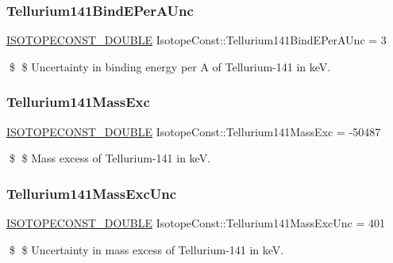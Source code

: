 \subsubsection{\texorpdfstring{Tellurium141\+Bind\+E\+Per\+A\+Unc}{Tellurium141BindEPerAUnc}}
{\footnotesize\ttfamily \mbox{\hyperlink{group___isotope_const-_macros_ga8f45a7272ce02c0b4c65c44636ed719a}{I\+S\+O\+T\+O\+P\+E\+C\+O\+N\+S\+T\+\_\+\+D\+O\+U\+B\+LE}} Isotope\+Const\+::\+Tellurium141\+Bind\+E\+Per\+A\+Unc = 3}

\$ \$ Uncertainty in binding energy per A of Tellurium-\/141 in keV. \mbox{\label{group___isotope_const-_tellurium-_te141_gac84bd58ed0e0b24aa4c090c67a823832}} 
\subsubsection{\texorpdfstring{Tellurium141\+Mass\+Exc}{Tellurium141MassExc}}
{\footnotesize\ttfamily \mbox{\hyperlink{group___isotope_const-_macros_ga8f45a7272ce02c0b4c65c44636ed719a}{I\+S\+O\+T\+O\+P\+E\+C\+O\+N\+S\+T\+\_\+\+D\+O\+U\+B\+LE}} Isotope\+Const\+::\+Tellurium141\+Mass\+Exc = -\/50487}

\$ \$ Mass excess of Tellurium-\/141 in keV. \mbox{\label{group___isotope_const-_tellurium-_te141_gad900681373042bf43e4c2dea7a878625}} 
\subsubsection{\texorpdfstring{Tellurium141\+Mass\+Exc\+Unc}{Tellurium141MassExcUnc}}
{\footnotesize\ttfamily \mbox{\hyperlink{group___isotope_const-_macros_ga8f45a7272ce02c0b4c65c44636ed719a}{I\+S\+O\+T\+O\+P\+E\+C\+O\+N\+S\+T\+\_\+\+D\+O\+U\+B\+LE}} Isotope\+Const\+::\+Tellurium141\+Mass\+Exc\+Unc = 401}

\$ \$ Uncertainty in mass excess of Tellurium-\/141 in keV. \mbox{\label{group___isotope_const-_tellurium-_te141_ga329263c221bd4e5d6e7db7a3c4e74d49}} 
